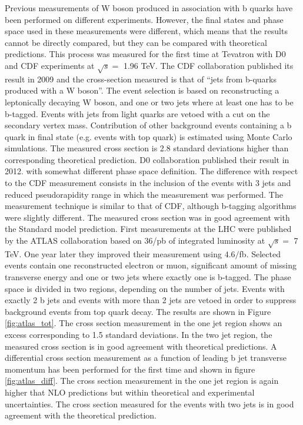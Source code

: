 	Previous measurements of W boson produced in association with b quarks have been performed on different experiments. However, the final states and phase space used in these measurements were different, which means that the results cannot be directly compared, but they can be compared with theoretical predictions. This process was measured for the first time at Tevatron with D0 and CDF experiments at $\sqrt{s} =$ 1.96 TeV. The CDF collaboration published its result in 2009 and the cross-section measured is that of “jets from b-quarks produced with a W boson”. The event selection is based on reconstructing a leptonically decaying W boson, and one or two jets where at least one has to be b-tagged. Events with jets from light quarks are vetoed with a cut on the secondary vertex mass. Contribution of other background events containing a b quark in final state (e.g. events with top quark) is estimated using Monte Carlo simulations. The measured cross section is 2.8 standard deviations higher than corresponding theoretical prediction. D0 collaboration published their result in 2012. with somewhat different phase space definition. The difference with respect to the CDF measurement consists in the inclusion of the events with 3 jets and reduced pseudorapidity range in which the measurement was performed. The measurement technique is similar to that of CDF, although b-tagging algorithms were slightly different. The measured cross section was in good agreement with the Standard model prediction.
	First measurements at the LHC were published by the ATLAS collaboration based on 36/pb of integrated luminosity at $\sqrt{s} =$ 7 TeV. One year later they improved their measurement using $4.6/$fb.\citep{Aad:2013vka} Selected events contain one reconstructed electron or muon, significant amount of missing transverse energy and one or two jets where exactly one is b-tagged. The phase space is divided in two regions, depending on the number of jets. Events with exactly 2 b jets and events with more than 2 jets are vetoed in order to suppress background events from top quark decay. The results are shown in Figure \ref{fig:atlas_tot}. The cross section measurement in the one jet region shows an excess corresponding to 1.5 standard deviations. In the two jet region, the measured cross section is in good agreement with theoretical predictions. A differential cross section measurement as a function of leading b jet transverse momentum has been performed for the first time and shown in figure \ref{fig:atlas_diff}. The cross section measurement in the one jet region is again higher that NLO predictions but within theoretical and experimental uncertainties. The cross section measured for the events with two jets is in good agreement with the theoretical prediction.
